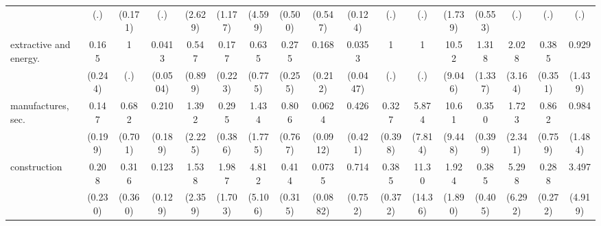 {\begin{tabular}{l*{16}{c}}
                    &         (.)         &     (0.171)         &         (.)         &     (2.629)         &     (1.177)         &     (4.599)         &     (0.500)         &     (0.547)         &     (0.124)         &         (.)         &         (.)         &     (1.739)         &     (0.553)         &         (.)         &         (.)         &         (.)         \\
[1em]
extractive and energy.&       0.165         &           1         &      0.0413\sym{**} &       0.547         &       0.177         &       0.635         &       0.275         &       0.168         &      0.0353\sym{**} &           1         &           1         &       10.52\sym{**} &       1.318         &       2.028         &       0.385         &       0.929         \\
                    &     (0.244)         &         (.)         &    (0.0504)         &     (0.899)         &     (0.223)         &     (0.775)         &     (0.255)         &     (0.212)         &    (0.0447)         &         (.)         &         (.)         &     (9.046)         &     (1.337)         &     (3.164)         &     (0.351)         &     (1.439)         \\
[1em]
manufactures, sec.  &       0.147         &       0.682         &       0.210         &       1.392         &       0.295         &       1.434         &       0.806         &      0.0624         &       0.426         &       0.327         &       5.874         &       10.61\sym{**} &       0.350         &       1.723         &       0.862         &       0.984         \\
                    &     (0.199)         &     (0.701)         &     (0.189)         &     (2.225)         &     (0.386)         &     (1.775)         &     (0.767)         &    (0.0912)         &     (0.421)         &     (0.398)         &     (7.814)         &     (9.448)         &     (0.399)         &     (2.341)         &     (0.759)         &     (1.484)         \\
[1em]
construction        &       0.208         &       0.316         &       0.123\sym{*}  &       1.538         &       1.987         &       4.812         &       0.414         &      0.0735\sym{*}  &       0.714         &       0.385         &       11.30         &       1.924         &       0.385         &       5.298         &       0.288         &       3.497         \\
                    &     (0.230)         &     (0.360)         &     (0.129)         &     (2.359)         &     (1.703)         &     (5.106)         &     (0.315)         &    (0.0882)         &     (0.752)         &     (0.372)         &     (14.36)         &     (1.890)         &     (0.405)         &     (6.292)         &     (0.272)         &     (4.919)         \\

\end{tabular}}
